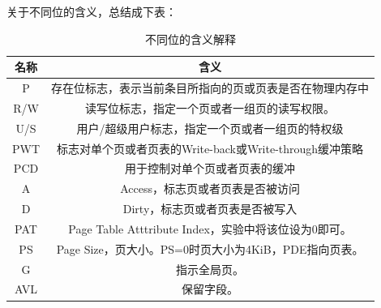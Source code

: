 \documentclass[UTF8,12pt]{ctexart}
\begin{document}
    关于不同位的含义，总结成下表：
\begin{table}[H]
\caption{不同位的含义解释}
\centering
\begin{tabular}{|c|c|}
\hline
\multicolumn{1}{|c|}{{\color[HTML]{000000} \textbf{名称}}} & \multicolumn{1}{c|}{{\color[HTML]{000000} \textbf{含义}}}          \\ \hline
{\color[HTML]{000000} P}                                 & {\color[HTML]{000000} 存在位标志，表示当前条目所指向的页或页表是否在物理内存中}             \\ \hline
{\color[HTML]{000000} R/W}                               & {\color[HTML]{000000} 读写位标志，指定一个页或者一组页的读写权限。}                   \\ \hline
{\color[HTML]{000000} U/S}                               & {\color[HTML]{000000} 用户/超级用户标志，指定一个页或者一组页的特权级}                 \\ \hline
{\color[HTML]{000000} PWT}                               & {\color[HTML]{000000} 标志对单个页或者页表的Write-back或Write-through缓冲策略}  \\ \hline
{\color[HTML]{000000} PCD}                               & {\color[HTML]{000000} 用于控制对单个页或者页表的缓冲}                          \\ \hline
{\color[HTML]{000000} A}                                 & {\color[HTML]{000000} Access，标志页或者页表是否被访问}                      \\ \hline
{\color[HTML]{000000} D}                                 & {\color[HTML]{000000} Dirty，标志页或者页表是否被写入}                       \\ \hline
{\color[HTML]{000000} PAT}                               & {\color[HTML]{000000} Page Table Atttribute Index，实验中将该位设为0即可。} \\ \hline
{\color[HTML]{000000} PS}                                & {\color[HTML]{000000} Page Size，页大小。PS=0时页大小为4KiB，PDE指向页表。}      \\ \hline
{\color[HTML]{000000} G}                                 & {\color[HTML]{000000} 指示全局页。}                                   \\ \hline
{\color[HTML]{000000} AVL}                               & {\color[HTML]{000000} 保留字段。}                                    \\ \hline
\end{tabular}
\end{table}
\end{document}
